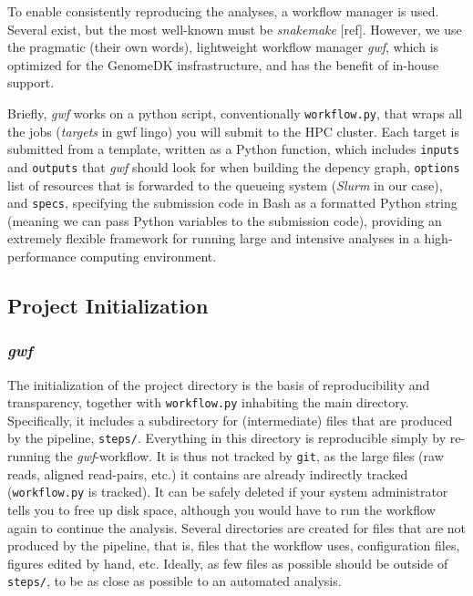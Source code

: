 \documentclass[
  11pt,
  a4paper,
]{scrbook}
\let\oldemph\emph
\renewcommand\emph[1]{\oldemph{\color{gray}#1}}
\begin{document}
To enable consistently reproducing the analyses, a workflow manager is
used. Several exist, but the most well-known must be \emph{snakemake}
{[}ref{]}. However, we use the pragmatic (their own words), lightweight
workflow manager \emph{gwf}, which is optimized for the GenomeDK
insfrastructure, and has the benefit of in-house support.

Briefly, \emph{gwf} works on a python script, conventionally
\texttt{workflow.py}, that wraps all the jobs (\emph{targets} in gwf
lingo) you will submit to the HPC cluster. Each target is submitted from
a template, written as a Python function, which includes \texttt{inputs}
and \texttt{outputs} that \emph{gwf} should look for when building the
depency graph, \texttt{options} list of resources that is forwarded to
the queueing system (\emph{Slurm} in our case), and \texttt{specs},
specifying the submission code in Bash as a formatted Python string
(meaning we can pass Python variables to the submission code), providing
an extremely flexible framework for running large and intensive analyses
in a high-performance computing environment.

\subsection{Project Initialization}\label{project-initialization}

\subsubsection{\texorpdfstring{\emph{gwf}}{gwf}}\label{gwf}

The initialization of the project directory is the basis of
reproducibility and transparency, together with \texttt{workflow.py}
inhabiting the main directory. Specifically, it includes a subdirectory
for (intermediate) files that are produced by the pipeline,
\texttt{steps/}. Everything in this directory is reproducible simply by
re-running the \emph{gwf}-workflow. It is thus not tracked by
\texttt{git}, as the large files (raw reads, aligned read-pairs, etc.)
it contains are already indirectly tracked (\texttt{workflow.py} is
tracked). It can be safely deleted if your system administrator tells
you to free up disk space, although you would have to run the workflow
again to continue the analysis. Several directories are created for
files that are not produced by the pipeline, that is, files that the
workflow uses, configuration files, figures edited by hand, etc.
Ideally, as few files as possible should be outside of \texttt{steps/},
to be as close as possible to an automated analysis.
\end{document}
